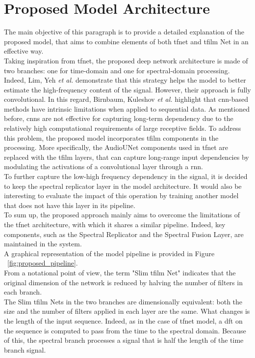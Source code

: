 \section{Proposed Model Architecture}
The main objective of this paragraph is to provide a detailed explanation of the proposed model, that aims to combine elements of both \gls{tfnet} and \gls{tfilm} Net in an effective way.\\
Taking inspiration from \gls{tfnet}, the proposed deep network architecture is made of two branches: one for time-domain and one for spectral-domain processing. Indeed, Lim, Yeh \textit{et al.} demonstrate that this strategy helps the model to better estimate the high-frequency content of the signal. However, their approach is fully convolutional. In this regard, Birnbaum, Kuleshov \textit{et al.} highlight that \gls{cnn}-based methods have intrinsic limitations when applied to sequential data. As mentioned before, \gls{cnn}s are not effective for capturing long-term dependency due to the relatively high computational requirements of large receptive fields. To address this problem, the proposed model incorporates \gls{tfilm} components in the processing. More specifically, the AudioUNet components used in \gls{tfnet} are replaced with the \gls{tfilm} layers, that can capture long-range input dependencies by modulating the activations of a convolutional layer through a \gls{rnn}. \\
To further capture the low-high frequency dependency in the signal, it is decided to keep the spectral replicator layer in the model architecture. It would also be interesting to evaluate the impact of this operation by training another model that does not have this layer in its pipeline.
\\ To sum up, the proposed approach mainly aims to overcome the limitations of the \gls{tfnet} architecture, with which it shares a similar pipeline. Indeed, key components, such as the Spectral Replicator and the Spectral Fusion Layer, are maintained in the system. \\
A graphical representation of the model pipeline is provided in Figure ~\ref{fig:proposed_pipeline}. \\
From a notational point of view, the term "Slim \gls{tfilm} Net" indicates that the original dimension of the network is reduced by halving the number of filters in each branch. \\
The Slim \gls{tfilm} Nets in the two branches are dimensionally equivalent: both the size and the number of filters applied in each layer are the same. What changes is the length of the input sequence. Indeed, as in the case of \gls{tfnet} model, a \gls{dft} on the sequence is computed to pass from the time to the spectral domain. Because of this, the spectral branch processes a signal that is half the length of the time branch signal.  
